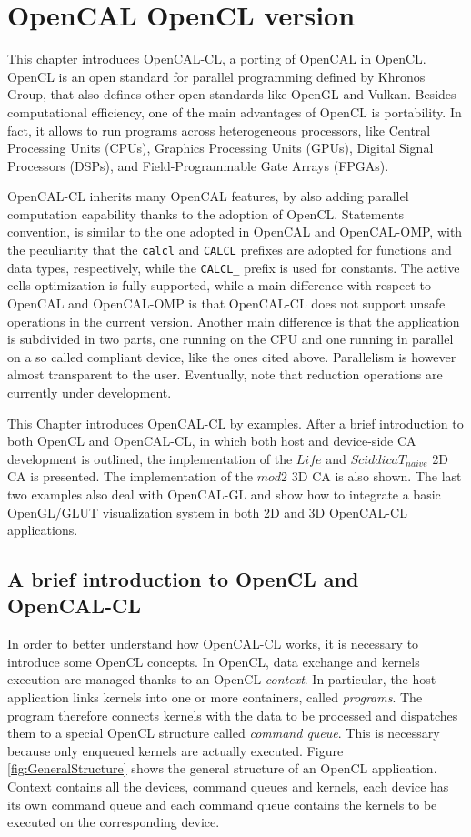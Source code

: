 \chapter{OpenCAL OpenCL version}\label{ch:opencal-cl}

This chapter introduces OpenCAL-CL, a porting of OpenCAL in
OpenCL. OpenCL is an open standard for parallel programming defined by
Khronos Group, that also defines other open standards like OpenGL and
Vulkan. Besides computational efficiency, one of the main advantages
of OpenCL is portability. In fact, it allows to run programs across
heterogeneous processors, like Central Processing Units (CPUs),
Graphics Processing Units (GPUs), Digital Signal Processors (DSPs),
and Field-Programmable Gate Arrays (FPGAs).

OpenCAL-CL inherits many OpenCAL features, by also adding parallel
computation capability thanks to the adoption of OpenCL. Statements
convention, is similar to the one adopted in OpenCAL and OpenCAL-OMP,
with the peculiarity that the \verb'calcl' and \verb'CALCL' prefixes
are adopted for functions and data types, respectively, while the
\verb'CALCL_' prefix is used for constants. The active cells
optimization is fully supported, while a main difference with respect
to OpenCAL and OpenCAL-OMP is that OpenCAL-CL does not support unsafe
operations in the current version. Another main difference is that the
application is subdivided in two parts, one running on the CPU and one
running in parallel on a so called compliant device, like the ones
cited above. Parallelism is however almost transparent to the
user. Eventually, note that reduction operations are currently under
development.

This Chapter introduces OpenCAL-CL by examples. After a brief
introduction to both OpenCL and OpenCAL-CL, in which both host and
device-side CA development is outlined, the implementation of the
$Life$ and $SciddicaT_{naive}$ 2D CA is presented. The implementation
of the $mod2$ 3D CA is also shown. The last two examples also deal
with OpenCAL-GL and show how to integrate a basic OpenGL/GLUT
visualization system in both 2D and 3D OpenCAL-CL applications.


\section{A brief introduction to OpenCL and OpenCAL-CL}\label{sec:opencalclstructure}

In order to better understand how OpenCAL-CL works, it is necessary to
introduce some OpenCL concepts. In OpenCL, data exchange and kernels
execution are managed thanks to an OpenCL \emph{context}. In
particular, the host application links kernels into one or more
containers, called \emph{programs}. The program therefore connects
kernels with the data to be processed and dispatches them to a special
OpenCL structure called \emph{command queue}. This is necessary
because only enqueued kernels are actually executed. Figure
\ref{fig:GeneralStructure} shows the general structure of an OpenCL
application. Context contains all the devices, command queues and
kernels, each device has its own command queue and each command queue
contains the kernels to be executed on the corresponding device.

